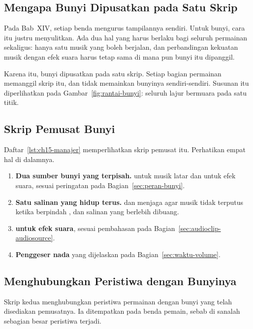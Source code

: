 \subsection{Mengapa Bunyi Dipusatkan pada Satu Skrip}

Pada Bab~XIV, setiap benda mengurus tampilannya sendiri. Untuk bunyi, cara itu
justru menyulitkan. Ada dua hal yang harus berlaku bagi seluruh permainan
sekaligus: hanya satu musik yang boleh berjalan, dan perbandingan kekuatan
musik dengan efek suara harus tetap sama di mana pun bunyi itu dipanggil.

Karena itu, bunyi dipusatkan pada satu skrip. Setiap bagian permainan memanggil
skrip itu, dan tidak memainkan bunyinya sendiri-sendiri. Susunan itu
diperlihatkan pada Gambar~\ref{fig:rantai-bunyi}: seluruh lajur bermuara pada
satu titik.

\subsection{Skrip Pemusat Bunyi}

Daftar~\ref{lst:ch15-manajer} memperlihatkan skrip pemusat itu. Perhatikan
empat hal di dalamnya.

\begin{enumerate}
  \item \textbf{Dua sumber bunyi yang terpisah.}  untuk
        musik latar dan  untuk efek suara, sesuai peringatan
        pada Bagian~\ref{sec:peran-bunyi}.
  \item \textbf{Satu salinan yang hidup terus.}  dan
         menjaga agar musik tidak terputus ketika
        berpindah , dan salinan yang berlebih dibuang.
  \item \textbf{ untuk efek suara}, sesuai pembahasan pada
        Bagian~\ref{sec:audioclip-audiosource}.
  \item \textbf{Penggeser nada} yang dijelaskan pada
        Bagian~\ref{sec:waktu-volume}.
\end{enumerate}


\subsection{Menghubungkan Peristiwa dengan Bunyinya}

Skrip kedua menghubungkan peristiwa permainan dengan bunyi yang telah
disediakan pemusatnya. Ia ditempatkan pada benda pemain, sebab di sanalah
sebagian besar peristiwa terjadi.

